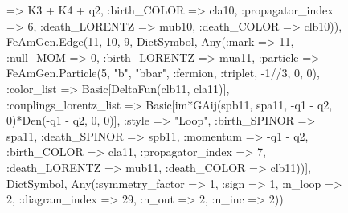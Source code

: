 \documentclass{revtex4}
\begin{document}
\begin{figure}[!htb]
\begin{center}
{=> K3 + K4 + q2, :birth_COLOR => cla10, :propagator_index => 6, :death_LORENTZ => mub10, :death_COLOR => clb10)), FeAmGen.Edge(11, 10, 9, Dict{Symbol, Any}(:mark => 11, :null_MOM => 0, :birth_LORENTZ => mua11, :particle => FeAmGen.Particle(5, "b", "bbar", :fermion, :triplet, -1//3, 0, 0), :color_list => Basic[DeltaFun(clb11, cla11)], :couplings_lorentz_list => Basic[im*GAij(spb11, spa11, -q1 - q2, 0)*Den(-q1 - q2, 0, 0)], :style => "Loop", :birth_SPINOR => spa11, :death_SPINOR => spb11, :momentum => -q1 - q2, :birth_COLOR => cla11, :propagator_index => 7, :death_LORENTZ => mub11, :death_COLOR => clb11))], Dict{Symbol, Any}(:symmetry_factor => 1, :sign => 1, :n_loop => 2, :diagram_index => 29, :n_out => 2, :n_inc => 2)) 
}
\end{center}
\end{figure}
\end{document}
